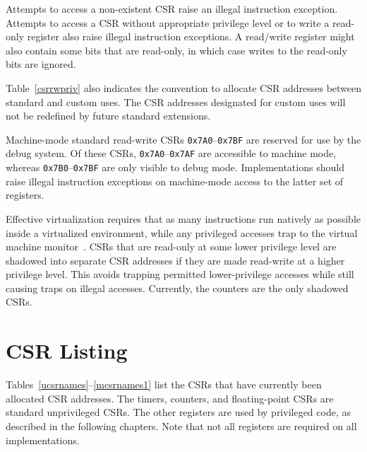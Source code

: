 Attempts to access a non-existent CSR raise an illegal instruction
exception.  Attempts to access a CSR without appropriate privilege
level or to write a read-only register also raise illegal instruction
exceptions.  A read/write register might also contain some bits that
are read-only, in which case writes to the read-only bits are ignored.

Table~\ref{csrrwpriv} also indicates the convention to allocate CSR
addresses between standard and custom uses.  The CSR addresses
designated for custom uses will not be redefined by future
standard extensions.

Machine-mode standard read-write CSRs {\tt 0x7A0}--{\tt 0x7BF} are reserved
for use by the debug system.  Of these CSRs, {\tt 0x7A0}--{\tt 0x7AF} are
accessible to machine mode, whereas {\tt 0x7B0}--{\tt 0x7BF} are only visible
to debug mode.  Implementations should raise illegal instruction exceptions on
machine-mode access to the latter set of registers.

\begin{commentary}
Effective virtualization requires that as many instructions run natively as
possible inside a virtualized environment, while any privileged accesses trap
to the virtual machine monitor~\cite{goldbergvm}.  CSRs that are read-only at
some lower privilege level are shadowed into separate CSR addresses if they
are made read-write at a higher privilege level.  This avoids trapping
permitted lower-privilege accesses while still causing traps on illegal
accesses.  Currently, the counters are the only shadowed CSRs.
\end{commentary}

\section{CSR Listing}

Tables~\ref{ucsrnames}--\ref{mcsrnames1} list the CSRs that have
currently been allocated CSR addresses.  The timers, counters, and
floating-point CSRs are standard unprivileged CSRs.
The other
registers are used by privileged code, as described in the following
chapters.  Note that not all registers are required on all
implementations.

